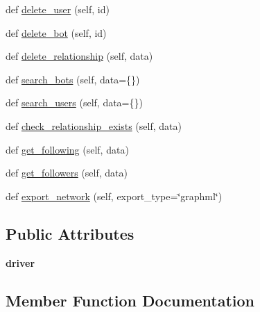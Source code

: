 \begin{DoxyCompactItemize}
\item 
def \hyperlink{classtwitter_1_1wrappers_1_1neo4j__wrapper_1_1Neo4jAPI_ae3b7f7e89b8fbf3ee7c3c93d983da7c7}{delete\+\_\+user} (self, id)
\item 
def \hyperlink{classtwitter_1_1wrappers_1_1neo4j__wrapper_1_1Neo4jAPI_a0995256fecdd24166fe3f8c0276a1124}{delete\+\_\+bot} (self, id)
\item 
def \hyperlink{classtwitter_1_1wrappers_1_1neo4j__wrapper_1_1Neo4jAPI_a8a22a235f9b252a3d890e50a3f8770e9}{delete\+\_\+relationship} (self, data)
\item 
def \hyperlink{classtwitter_1_1wrappers_1_1neo4j__wrapper_1_1Neo4jAPI_a94d7463864ce54f396cef3b256825f60}{search\+\_\+bots} (self, data=\{\})
\item 
def \hyperlink{classtwitter_1_1wrappers_1_1neo4j__wrapper_1_1Neo4jAPI_a267693caebe2e0e18ed479c8fc7369bf}{search\+\_\+users} (self, data=\{\})
\item 
def \hyperlink{classtwitter_1_1wrappers_1_1neo4j__wrapper_1_1Neo4jAPI_a8766eab9dfb3a44143b70175659a5c70}{check\+\_\+relationship\+\_\+exists} (self, data)
\item 
def \hyperlink{classtwitter_1_1wrappers_1_1neo4j__wrapper_1_1Neo4jAPI_afe328bc3bff856511ffe291bf6e94e8e}{get\+\_\+following} (self, data)
\item 
def \hyperlink{classtwitter_1_1wrappers_1_1neo4j__wrapper_1_1Neo4jAPI_a2a940dd718e1fd4d724b8f47a6d5a896}{get\+\_\+followers} (self, data)
\item 
def \hyperlink{classtwitter_1_1wrappers_1_1neo4j__wrapper_1_1Neo4jAPI_a9ed611dcf191c1a3bb384090caff703e}{export\+\_\+network} (self, export\+\_\+type=\char`\"{}graphml\char`\"{})
\end{DoxyCompactItemize}
\subsection*{Public Attributes}
\begin{DoxyCompactItemize}
\item 
\mbox{\label{classtwitter_1_1wrappers_1_1neo4j__wrapper_1_1Neo4jAPI_aa8d04f27c45991a75026f5030f150969}} 
{\bfseries driver}
\end{DoxyCompactItemize}


\subsection{Member Function Documentation}
\mbox{\label{classtwitter_1_1wrappers_1_1neo4j__wrapper_1_1Neo4jAPI_a188c0f42742ff0ae94017a161e6c2633}} 
